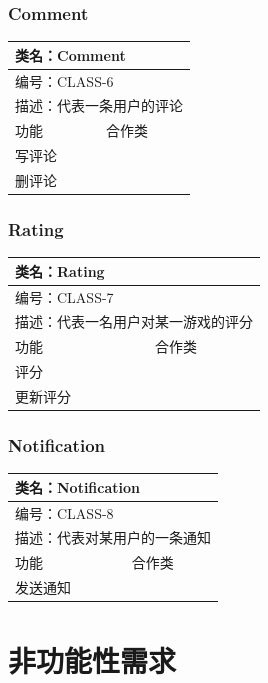 \documentclass[12pt]{ctexart} %
\begin{document}
\subsubsection{Comment}
\begin{tabular}{|l|l|}
  \hline
  \multicolumn{2}{|l|}{类名：Comment} \\
  \hline
  \multicolumn{2}{|l|}{编号：CLASS-6} \\
  \hline
  \multicolumn{2}{|l|}{描述：代表一条用户的评论} \\
  \hline
  功能 & 合作类 \\
  \hline
  写评论 & \\
  \hline
  删评论 & \\
  \hline
  \end{tabular}

\subsubsection{Rating}
\begin{tabular}{|l|l|}
  \hline
  \multicolumn{2}{|l|}{类名：Rating} \\
  \hline
  \multicolumn{2}{|l|}{编号：CLASS-7} \\
  \hline
  \multicolumn{2}{|l|}{描述：代表一名用户对某一游戏的评分} \\
  \hline
  功能 & 合作类 \\
  \hline
  评分 & \\
  \hline
  更新评分 & \\
  \hline
  \end{tabular}

\subsubsection{Notification}
\begin{tabular}{|l|l|}
  \hline
  \multicolumn{2}{|l|}{类名：Notification} \\
  \hline
  \multicolumn{2}{|l|}{编号：CLASS-8} \\
  \hline
  \multicolumn{2}{|l|}{描述：代表对某用户的一条通知} \\
  \hline
  功能 & 合作类 \\
  \hline
  发送通知 & \\
  \hline
  \end{tabular}

\section{非功能性需求}
\end{document}

